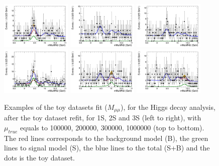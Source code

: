 \begin{figure}[!htbp]
\begin{center}
\includegraphics[width=0.3\textwidth]{figures_and_tables/modeling_xchecks/plots/HToUpsilon1SPhoton_Cat0_signalStrenght_300000/Cat0_mMuMNU_fit_s}
\includegraphics[width=0.3\textwidth]{figures_and_tables/modeling_xchecks/plots/HToUpsilon2SPhoton_Cat0_signalStrenght_300000/Cat0_mMuMNU_fit_s}
\includegraphics[width=0.3\textwidth]{figures_and_tables/modeling_xchecks/plots/HToUpsilon3SPhoton_Cat0_signalStrenght_300000/Cat0_mMuMNU_fit_s}
\includegraphics[width=0.3\textwidth]{figures_and_tables/modeling_xchecks/plots/HToUpsilon1SPhoton_Cat0_signalStrenght_1000000/Cat0_mMuMNU_fit_s}
\includegraphics[width=0.3\textwidth]{figures_and_tables/modeling_xchecks/plots/HToUpsilon2SPhoton_Cat0_signalStrenght_1000000/Cat0_mMuMNU_fit_s}
\includegraphics[width=0.3\textwidth]{figures_and_tables/modeling_xchecks/plots/HToUpsilon3SPhoton_Cat0_signalStrenght_1000000/Cat0_mMuMNU_fit_s}
\end{center}
\caption{Examples of the toy datasets fit ($M_{\mu\mu}$), for the Higgs decay analysis, after the toy dataset refit, for 1S, 2S and 3S (left to right), with $\mu_{true}$ equals to 100000, 200000, 300000, 1000000 (top to bottom). The red lines corresponds to the background model (B), the green lines to signal model (S), the blue lines to the total (S+B) and the dots is the toy dataset.}
\label{fig:fits_xchecks_mMuMNU_H}
\end{figure}
